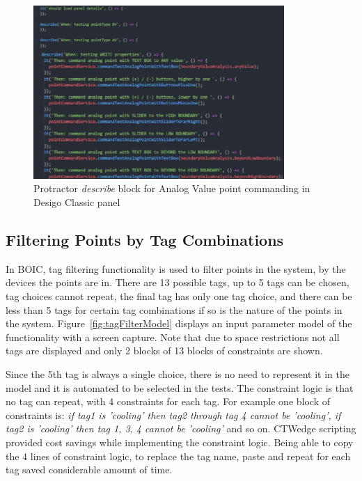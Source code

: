 \documentclass[conference]{IEEEtran}
\begin{document}
	
	\begin{figure}[!ht]
	\centering
		\includegraphics[width=0.85\textwidth,]{pointCommandingTestCode.pdf}
		\caption{Protractor \textit{describe} block for Analog Value point commanding in Desigo Classic panel}
		\label{fig:pointCommandingTestCode}
	\end{figure}

	\subsection{Filtering Points by Tag Combinations }

	In BOIC, tag filtering functionality is used to filter points in the system, by the devices the points are in.
	There are 13 possible tags, up to 5 tags can be chosen, tag choices cannot repeat, the final tag has only one tag choice, and there can be less than 5 tags for certain tag combinations if so is the nature of the points in the system.
	Figure~\ref{fig:tagFilterModel} displays an input parameter model of the functionality with a screen capture. 
	Note that due to space restrictions not all tags are displayed and only 2 blocks of 13 blocks of constraints are shown.
	
	Since the 5th tag is always a single choice, there is no need to represent it in the model and it is automated to be selected in the tests.
	The constraint logic is that no tag can repeat, with 4 constraints for each tag.
	For example one block of constraints is: \textit{if tag1 is 'cooling' then tag2 through tag 4 cannot be 'cooling', if tag2 is 'cooling' then tag 1, 3, 4 cannot be 'cooling'} and so on.
	CTWedge scripting provided cost savings while implementing the constraint logic. 
	Being able to copy the 4 lines of constraint logic, to replace the tag name, paste and repeat for each tag saved considerable amount of time.
\end{document}
